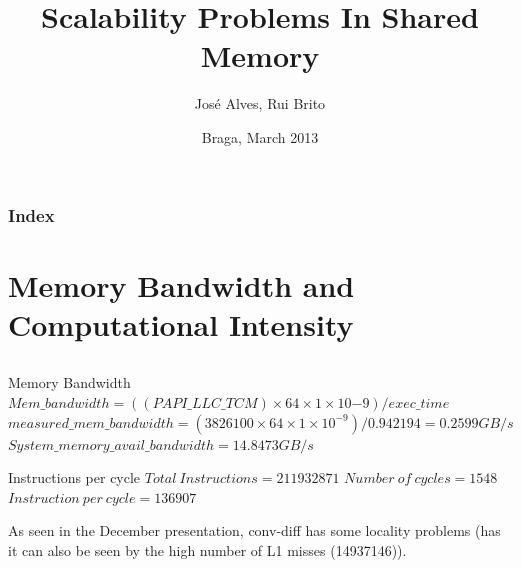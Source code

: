 \documentclass{beamer}
\title{Scalability Problems In Shared Memory}
\author{José Alves, Rui Brito}
\institute[pg22765, pg22781]{
	Universidade do Minho
}
\date{Braga, March 2013}
\begin{document}

\maketitle%

\begin{frame}
	\frametitle{Index}
	\tableofcontents
\end{frame}


\section{Memory Bandwidth and Computational Intensity}
\subsection{}
\small
\begin{frame}
\begin{block}{Memory Bandwidth}
	$Mem\_bandwidth = ((PAPI\_LLC\_TCM) \times 64 \times 1 \times 10{-9}) / exec\_time$
	$measured\_mem\_bandwidth = (3826100 \times 64 \times 1 \times 10^{-9})/0.942194 = 0.2599 GB/s$\\
	$System\_memory\_avail\_bandwidth = 14.8473 GB/s$
\end{block}
\begin{block}{Instructions per cycle}
	$Total\ Instructions = 211932871$
	$Number\ of\ cycles = 1548$
	$Instruction\ per\ cycle = 136907$
\end{block}
As seen in the December presentation, conv-diff has some locality problems (has it can also be seen by the high number of L1 misses (14937146)).
\end{frame}
\end{document}

